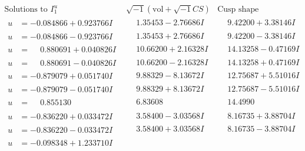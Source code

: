 \documentclass[1p]{elsarticle_modified}
\theoremstyle{definition}
\newcommand{\I}{\sqrt{-1}}
\begin{document}
$$\begin{array}{c|c|c}  
\text{Solutions to }I^u_{1}& \I (\text{vol} + \sqrt{-1}CS) & \text{Cusp shape}\\
 \hline 
\begin{aligned}
u &= -0.084866 + 0.923766 I\end{aligned}
 & \phantom{-}1.35453 - 2.76686 I & \phantom{-}9.42200 + 3.38146 I \\ \hline\begin{aligned}
u &= -0.084866 - 0.923766 I\end{aligned}
 & \phantom{-}1.35453 + 2.76686 I & \phantom{-}9.42200 - 3.38146 I \\ \hline\begin{aligned}
u &= \phantom{-}0.880691 + 0.040826 I\end{aligned}
 & \phantom{-}10.66200 + 2.16328 I & \phantom{-}14.13258 - 0.47169 I \\ \hline\begin{aligned}
u &= \phantom{-}0.880691 - 0.040826 I\end{aligned}
 & \phantom{-}10.66200 - 2.16328 I & \phantom{-}14.13258 + 0.47169 I \\ \hline\begin{aligned}
u &= -0.879079 + 0.051740 I\end{aligned}
 & \phantom{-}9.88329 - 8.13672 I & \phantom{-}12.75687 + 5.51016 I \\ \hline\begin{aligned}
u &= -0.879079 - 0.051740 I\end{aligned}
 & \phantom{-}9.88329 + 8.13672 I & \phantom{-}12.75687 - 5.51016 I \\ \hline\begin{aligned}
u &= \phantom{-}0.855130\phantom{ +0.000000I}\end{aligned}
 & \phantom{-}6.83608\phantom{ +0.000000I} & \phantom{-}14.4990\phantom{ +0.000000I} \\ \hline\begin{aligned}
u &= -0.836220 + 0.033472 I\end{aligned}
 & \phantom{-}3.58400 - 3.03568 I & \phantom{-}8.16735 + 3.88704 I \\ \hline\begin{aligned}
u &= -0.836220 - 0.033472 I\end{aligned}
 & \phantom{-}3.58400 + 3.03568 I & \phantom{-}8.16735 - 3.88704 I \\ \hline\begin{aligned}
u &= -0.098348 + 1.233710 I\end{aligned}

\end{array}$$
\end{document}
